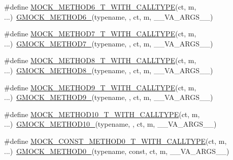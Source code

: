 \begin{DoxyCompactItemize}
\item 
\#define \mbox{\hyperlink{gmock-generated-function-mockers_8h_a0dfe65f974c2b6d60cac3114489b4527}{M\+O\+C\+K\+\_\+\+M\+E\+T\+H\+O\+D6\+\_\+\+T\+\_\+\+W\+I\+T\+H\+\_\+\+C\+A\+L\+L\+T\+Y\+PE}}(ct,  m, ...)~\mbox{\hyperlink{gmock-generated-function-mockers_8h_ad0ca7f6973a076d0af4c953f8ed91842}{G\+M\+O\+C\+K\+\_\+\+M\+E\+T\+H\+O\+D6\+\_\+}}(typename, , ct, m, \+\_\+\+\_\+\+V\+A\+\_\+\+A\+R\+G\+S\+\_\+\+\_\+)
\item 
\#define \mbox{\hyperlink{gmock-generated-function-mockers_8h_ae820565d836fda34401e8bdcfaaa7605}{M\+O\+C\+K\+\_\+\+M\+E\+T\+H\+O\+D7\+\_\+\+T\+\_\+\+W\+I\+T\+H\+\_\+\+C\+A\+L\+L\+T\+Y\+PE}}(ct,  m, ...)~\mbox{\hyperlink{gmock-generated-function-mockers_8h_ab98a8399ba62b53b375c2807f4d39d2f}{G\+M\+O\+C\+K\+\_\+\+M\+E\+T\+H\+O\+D7\+\_\+}}(typename, , ct, m, \+\_\+\+\_\+\+V\+A\+\_\+\+A\+R\+G\+S\+\_\+\+\_\+)
\item 
\#define \mbox{\hyperlink{gmock-generated-function-mockers_8h_a0cf1d3aba371dfe424d27b97b5473174}{M\+O\+C\+K\+\_\+\+M\+E\+T\+H\+O\+D8\+\_\+\+T\+\_\+\+W\+I\+T\+H\+\_\+\+C\+A\+L\+L\+T\+Y\+PE}}(ct,  m, ...)~\mbox{\hyperlink{gmock-generated-function-mockers_8h_aa84a36427c44505207b7cad5dec7ad67}{G\+M\+O\+C\+K\+\_\+\+M\+E\+T\+H\+O\+D8\+\_\+}}(typename, , ct, m, \+\_\+\+\_\+\+V\+A\+\_\+\+A\+R\+G\+S\+\_\+\+\_\+)
\item 
\#define \mbox{\hyperlink{gmock-generated-function-mockers_8h_ad1bd879e10bad098cf68c27c75f4be09}{M\+O\+C\+K\+\_\+\+M\+E\+T\+H\+O\+D9\+\_\+\+T\+\_\+\+W\+I\+T\+H\+\_\+\+C\+A\+L\+L\+T\+Y\+PE}}(ct,  m, ...)~\mbox{\hyperlink{gmock-generated-function-mockers_8h_aa820171a19cc587c247dbe05cbffc55f}{G\+M\+O\+C\+K\+\_\+\+M\+E\+T\+H\+O\+D9\+\_\+}}(typename, , ct, m, \+\_\+\+\_\+\+V\+A\+\_\+\+A\+R\+G\+S\+\_\+\+\_\+)
\item 
\#define \mbox{\hyperlink{gmock-generated-function-mockers_8h_ae0460a593b7868a5573117032d6d2e3e}{M\+O\+C\+K\+\_\+\+M\+E\+T\+H\+O\+D10\+\_\+\+T\+\_\+\+W\+I\+T\+H\+\_\+\+C\+A\+L\+L\+T\+Y\+PE}}(ct,  m, ...)~\mbox{\hyperlink{gmock-generated-function-mockers_8h_a81a48223a8771de36ef92ac6d56f6e81}{G\+M\+O\+C\+K\+\_\+\+M\+E\+T\+H\+O\+D10\+\_\+}}(typename, , ct, m, \+\_\+\+\_\+\+V\+A\+\_\+\+A\+R\+G\+S\+\_\+\+\_\+)
\item 
\#define \mbox{\hyperlink{gmock-generated-function-mockers_8h_a4d7f87bf059071344e3a80c7fd1b9051}{M\+O\+C\+K\+\_\+\+C\+O\+N\+S\+T\+\_\+\+M\+E\+T\+H\+O\+D0\+\_\+\+T\+\_\+\+W\+I\+T\+H\+\_\+\+C\+A\+L\+L\+T\+Y\+PE}}(ct,  m, ...)~\mbox{\hyperlink{gmock-generated-function-mockers_8h_ae0d290ffa58d7c624b2e3487ba1252f4}{G\+M\+O\+C\+K\+\_\+\+M\+E\+T\+H\+O\+D0\+\_\+}}(typename, const, ct, m, \+\_\+\+\_\+\+V\+A\+\_\+\+A\+R\+G\+S\+\_\+\+\_\+)

\end{DoxyCompactItemize}
